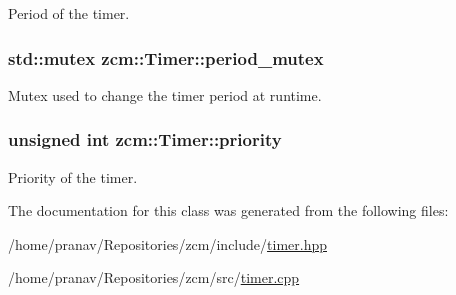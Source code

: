 Period of the timer. 

\subsubsection[{\texorpdfstring{period\+\_\+mutex}{period_mutex}}]{\setlength{\rightskip}{0pt plus 5cm}std\+::mutex zcm\+::\+Timer\+::period\+\_\+mutex\hspace{0.3cm}{\ttfamily [private]}}\hypertarget{classzcm_1_1Timer_af9d6ce4df403e44b543241926ddcf41f}{}\label{classzcm_1_1Timer_af9d6ce4df403e44b543241926ddcf41f}


Mutex used to change the timer period at runtime. 

\subsubsection[{\texorpdfstring{priority}{priority}}]{\setlength{\rightskip}{0pt plus 5cm}unsigned int zcm\+::\+Timer\+::priority\hspace{0.3cm}{\ttfamily [private]}}\hypertarget{classzcm_1_1Timer_a722f6390254d106117d8e1545b6092ab}{}\label{classzcm_1_1Timer_a722f6390254d106117d8e1545b6092ab}


Priority of the timer. 



The documentation for this class was generated from the following files\+:\begin{DoxyCompactItemize}
\item 
/home/pranav/\+Repositories/zcm/include/\hyperlink{timer_8hpp}{timer.\+hpp}\item 
/home/pranav/\+Repositories/zcm/src/\hyperlink{timer_8cpp}{timer.\+cpp}\end{DoxyCompactItemize}
